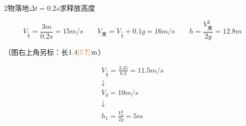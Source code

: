 \begin{problem}[①]
2物落地\quad $\Delta t=0.2\unit{s}$\quad 求释放高度
\begin{solution}
\[
V_{\frac t2}=\frac{3\unit{m}}{0.2\unit{s}}=15\unit{m/s}\qquad
V_{\text{末}}=V_{\frac t2}+0.1g=16\unit{m/s}\qquad %
h=\frac{V_{\text{末}}^{2}}{2g}=12.8\unit{m}
\]
\end{solution}
\end{problem}
\begin{problem}[②]
（图右上角另标：长$1.4\unclear{5}\unit{m}$） %
\begin{solution}
\begin{gather*}
V_{\frac t2}=\frac{3.45}{0.3}=11.5\unit{m/s}\\
\downarrow\\
V_0=10\unit{m/s}\\
\downarrow\\
h_1=\frac{V_0^{2}}{2g}=5\unit{m}
\end{gather*}
\end{solution}
\end{problem}
